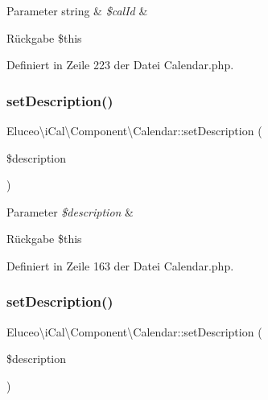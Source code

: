\begin{DoxyParams}[1]{Parameter}
string & {\em \$cal\+Id} & \\
\hline
\end{DoxyParams}
\begin{DoxyReturn}{Rückgabe}
\$this 
\end{DoxyReturn}


Definiert in Zeile 223 der Datei Calendar.\+php.

\mbox{\label{class_eluceo_1_1i_cal_1_1_component_1_1_calendar_aedd67c51c2fe1386f132bfb45148cb59}} 
\subsubsection{\texorpdfstring{set\+Description()}{setDescription()}\hspace{0.1cm}{\footnotesize\ttfamily [1/3]}}
{\footnotesize\ttfamily Eluceo\textbackslash{}i\+Cal\textbackslash{}\+Component\textbackslash{}\+Calendar\+::set\+Description (\begin{DoxyParamCaption}\item[{}]{\$description }\end{DoxyParamCaption})}


\begin{DoxyParams}{Parameter}
{\em \$description} & \\
\hline
\end{DoxyParams}
\begin{DoxyReturn}{Rückgabe}
\$this 
\end{DoxyReturn}


Definiert in Zeile 163 der Datei Calendar.\+php.

\mbox{\label{class_eluceo_1_1i_cal_1_1_component_1_1_calendar_aedd67c51c2fe1386f132bfb45148cb59}} 
\subsubsection{\texorpdfstring{set\+Description()}{setDescription()}\hspace{0.1cm}{\footnotesize\ttfamily [2/3]}}
{\footnotesize\ttfamily Eluceo\textbackslash{}i\+Cal\textbackslash{}\+Component\textbackslash{}\+Calendar\+::set\+Description (\begin{DoxyParamCaption}\item[{}]{\$description }\end{DoxyParamCaption})}


